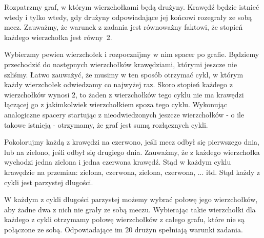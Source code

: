 \noindent
Rozpatrzmy graf, w którym wierzchołkami będą drużyny. Krawędź będzie istnieć wtedy i tylko wtedy, gdy drużyny odpowiadające jej końcowi rozegrały ze sobą mecz. Zauważmy, że warunek z zadania jest równoważny faktowi, że stopień każdego wierzchołka jest równy~2. 

\vspace{10px}
\noindent
Wybierzmy pewien wierzchołek i rozpocznijmy w nim spacer po grafie. Będziemy przechodzić do następnych wierzchołków krawędziami, którymi jeszcze nie szliśmy. Łatwo zauważyć, że musimy w ten sposób otrzymać cykl, w którym każdy wierzchołek odwiedzamy co najwyżej raz. Skoro stopień każdego z wierzchołków wynosi $2$, to żaden z wierzchołków tego cyklu nie ma krawędzi łączącej go z jakimkolwiek wierzchołkiem spoza tego cyklu. Wykonując analogiczne spacery startując z nieodwiedzonych jeszcze wierzchołków - o ile takowe istnieją - otrzymamy, że graf jest sumą rozłącznych cykli.

\vspace{10px}
\noindent
Pokolorujmy każdą z krawędzi na czerwono, jeśli mecz odbył się pierwszego dnia, lub na zielono, jeśli odbył się drugiego dnia. Zauważmy, że z każdego wierzchołka wychodzi jedna zielona i jedna czerwona krawędź. Stąd w każdym cyklu krawędzie na przemian: zielona, czerwona, zielona, czerwona, ... itd. Stąd każdy z cykli jest parzystej długości. 

\begin{center}
\end{center}

\vspace{10px}
\noindent
W każdym z cykli długości parzystej możemy wybrać połowę jego wierzchołków, aby żadne dwa z nich nie grały ze sobą meczu. Wybierając takie wierzchołki dla każdego z cykli otrzymamy połowę wierzchołków z całego grafu, które nie są połączone ze sobą. Odpowiadające im $20$ drużyn spełniają warunki zadania.

